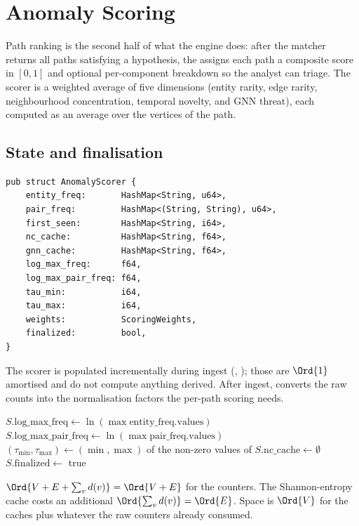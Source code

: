 \chapter{Anomaly Scoring}
\label{ch:anomaly}

Path ranking is the second half of what the engine does: after the
matcher returns all paths satisfying a hypothesis, the
\Scorer{} assigns each path a composite score in $[0, 1]$ and
optional per-component breakdown so the analyst can triage. The
scorer is a weighted average of five dimensions
(entity rarity, edge rarity, neighbourhood concentration, temporal
novelty, and GNN threat), each computed as an average over the
vertices of the path.

\section{State and finalisation}

\begin{lstlisting}[style=rust]
pub struct AnomalyScorer {
    entity_freq:       HashMap<String, u64>,
    pair_freq:         HashMap<(String, String), u64>,
    first_seen:        HashMap<String, i64>,
    nc_cache:          HashMap<String, f64>,
    gnn_cache:         HashMap<String, f64>,
    log_max_freq:      f64,
    log_max_pair_freq: f64,
    tau_min:           i64,
    tau_max:           i64,
    weights:           ScoringWeights,
    finalized:         bool,
}
\end{lstlisting}

The scorer is populated incrementally during ingest
(, ); those are
$\Ord{1}$ amortised and do not compute anything derived. After
ingest,  converts the raw counts into the
normalisation factors the per-path scoring needs.

\begin{algorithm}
\caption{\textsc{Anomaly-Finalize}}\label{alg:anomaly-finalize}
$S.\text{log\_max\_freq} \gets \ln(\max \text{entity\_freq.values})$\;
$S.\text{log\_max\_pair\_freq} \gets \ln(\max \text{pair\_freq.values})$\;
$(\tau_{\min}, \tau_{\max}) \gets (\min, \max)$ of the non-zero
values of \;
$S.\text{nc\_cache} \gets \emptyset$\;
$S.\text{finalized} \gets $ true\;
\end{algorithm}

\begin{complexity}
$\Ord{V + E + \sum_v d(v)} = \Ord{V + E}$ for the counters. The
Shannon-entropy cache costs an additional
$\Ord{\sum_v d(v)} = \Ord{E}$. Space is
$\Ord{V}$ for the caches plus whatever the raw counters already
consumed.
\end{complexity}

